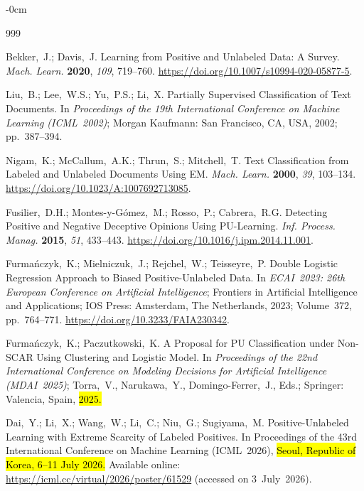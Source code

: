 \documentclass[applsci,article,accept,pdftex,moreauthors]{Definitions/mdpi}
\begin{document}
\begin{adjustwidth}{-\extralength}{0cm}

\begin{thebibliography}{999}

Bekker,~J.; Davis,~J.
Learning from Positive and Unlabeled Data: A Survey.
\textit{Mach. Learn.} \textbf{2020}, \textit{109}, 719--760.
\url{https://doi.org/10.1007/s10994-020-05877-5}.

Liu,~B.; Lee,~W.S.; Yu,~P.S.; Li,~X.
Partially Supervised Classification of Text Documents.
In \textit{Proceedings of the 19th International Conference on Machine Learning (ICML~2002)};
Morgan Kaufmann: San Francisco, CA, USA, 2002; pp.~387--394.

Nigam,~K.; McCallum,~A.K.; Thrun,~S.; Mitchell,~T.
Text Classification from Labeled and Unlabeled Documents Using EM.
\textit{Mach. Learn.} \textbf{2000}, \textit{39}, 103--134.
\url{https://doi.org/10.1023/A:1007692713085}.

Fusilier,~D.H.; Montes-y-G\'{o}mez,~M.; Rosso,~P.; Cabrera,~R.G.
Detecting Positive and Negative Deceptive Opinions Using PU-Learning.
\textit{Inf. Process. Manag.} \textbf{2015}, \textit{51}, 433--443.
\url{https://doi.org/10.1016/j.ipm.2014.11.001}.

Furma\'{n}czyk,~K.; Mielniczuk,~J.; Rejchel,~W.; Teisseyre,~P.
Double Logistic Regression Approach to Biased Positive-Unlabeled Data.
In \textit{ECAI~2023: 26th European Conference on Artificial Intelligence};
Frontiers in Artificial Intelligence and Applications;
IOS Press: Amsterdam, The Netherlands, 2023; Volume~372, pp.~764--771.
\url{https://doi.org/10.3233/FAIA230342}.

Furma\'{n}czyk,~K.; Paczutkowski,~K.
A Proposal for PU Classification under Non-SCAR Using Clustering and Logistic Model.
In \textit{Proceedings of the 22nd International Conference on Modeling Decisions
for Artificial Intelligence (MDAI~2025)};
Torra,~V., Narukawa,~Y., Domingo-Ferrer,~J., Eds.;
Springer: Valencia, Spain, \hl{2025.} %

Dai,~Y.; Li,~X.; Wang,~W.; Li,~C.; Niu,~G.; Sugiyama,~M.
Positive-Unlabeled Learning with Extreme Scarcity of Labeled Positives.
In Proceedings of the 43rd International Conference on Machine Learning (ICML~2026), \hl{Seoul, Republic of Korea, 6--11 July 2026.} %
Available online: \url{https://icml.cc/virtual/2026/poster/61529} (accessed on 3~July~2026).


\end{thebibliography}
\end{adjustwidth}
\end{document}
